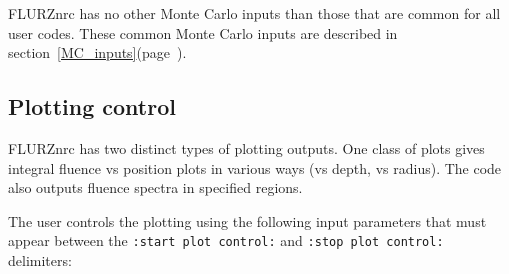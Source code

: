 \documentclass[12pt,twoside]{article}  %
\newcommand{\lpage}[1]{(page~\pageref{#1})}
\begin{document}
FLURZnrc has no other Monte Carlo inputs than those that are common
for all user codes.  These common Monte Carlo inputs are described
in section~\ref{MC_inputs}\lpage{MC_inputs}.

\subsection{Plotting control}

FLURZnrc has two distinct types of plotting outputs. One class of plots
gives integral fluence vs position plots in various ways (vs depth, vs
radius).  The code also outputs fluence spectra in specified regions.

The user controls the plotting using the
following input parameters that must appear between the 
{\tt :start plot control:} and {\tt :stop plot control:} delimiters:
\end{document}
